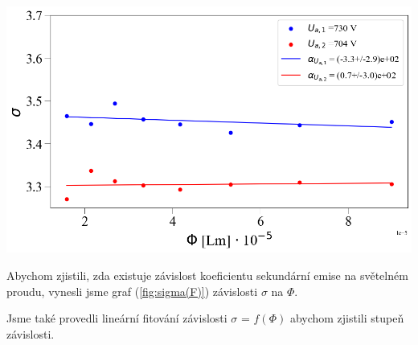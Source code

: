 \documentclass[a4paper,11pt]{article}
\begin{document}
    \begin{minipage}[t]{0.5\textwidth} 
                \vspace{-50pt}
                \par \centering
                \includegraphics[scale=0.33]{sigma(F)}
                \captionsetup{justification=centering, font=footnotesize}
                \label{fig:sigma(F)}
                \vspace{10pt}
                \raggedright 
                
                \par Abychom zjistili, zda existuje závislost koeficientu sekundární emise na světelném proudu, vynesli jsme graf (\ref{fig:sigma(F)}) závislosti $\sigma$ na $\Phi$.
                \par Jsme také provedli lineární fitování závislosti $\sigma$ = $f(\Phi)$ abychom zjistili stupeň závislosti.

\end{minipage}
\end{document}
